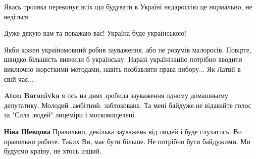 \begin{itemize}
\begin{itemize}
Якась троляка переконує всіх що будувати в Україні нєдароссію це нормально, не ведіться

\end{itemize}

 
Дуже дякую вам та поважаю вас! Україна буде українською!

 

Якби кожен україномовний робив зауваження, або не розумів малоросів. Повірте,
швидко більшість вивчили б українську. Наразі українізацію потрібно вводити
виключно жорсткими методами, навіть позбавляти права вибору... Як Латвії в свій
час...

\begin{itemize}
 
\textbf{Aton Baranivka} я ось на днях зробила зауваження одному домашньому депутатику. Молодий .амбітний. заблокована. Та мені байдуже.не відавайте голос за "Сила людей" лицеміри і московощелепі.

\begin{itemize}
 
\textbf{Ніна Шевцова} Правильно, декілька зауважень від людей і буде слухатись. Ви правильно робите. Таких Ви, має бути більше. Не потрібно бути байдужими. Ми будуємо країну, не хтось інший.
\end{itemize}

 


\end{itemize}
\end{itemize}
